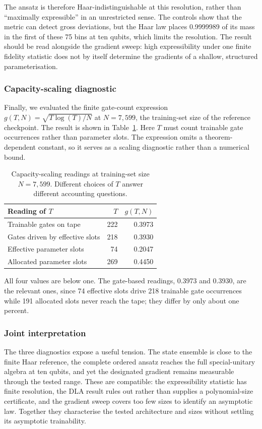 \documentclass[conference]{IEEEtran}
\begin{document}
The ansatz is therefore Haar-indistinguishable at this resolution, rather than
``maximally expressible'' in an unrestricted sense. The controls show that the
metric can detect gross deviations, but the Haar law places 0.9999989 of its
mass in the first of these 75 bins at ten qubits, which limits the resolution.
The result should be read alongside the gradient sweep: high expressibility
under one finite fidelity statistic does not by itself determine the gradients
of a shallow, structured parameterisation.

\subsubsection{Capacity-scaling diagnostic}
Finally, we evaluated the finite gate-count expression
$g(T,N)=\sqrt{T\log(T)/N}$ at $N=7,599$, the training-set size of the reference checkpoint. The result is shown in Table~\ref{tab:generalization}. Here
$T$ must count trainable gate occurrences rather than parameter slots. The expression omits a theorem-dependent constant, so it serves as a scaling diagnostic rather than a numerical bound.

\begin{table}[!t]
\caption{Capacity-scaling readings at training-set size $N=7,599$. Different choices of $T$ answer different accounting questions.}
\label{tab:generalization}
\centering
\small
\begin{tabular}{@{}lrr@{}}
\toprule
\textbf{Reading of $T$} & \textbf{$T$} & \textbf{$g(T,N)$} \\
\midrule
Trainable gates on tape & 222 & 0.3973 \\
Gates driven by effective slots & 218 & 0.3930 \\
Effective parameter slots & 74 & 0.2047 \\
Allocated parameter slots & 269 & 0.4450 \\
\bottomrule
\end{tabular}
\end{table}

All four values are below one. The gate-based readings, 0.3973 and 0.3930, are the relevant ones, since 74 effective slots drive 218 trainable gate occurrences while 191 allocated slots never reach the tape; they differ by only about one percent.

\subsubsection{Joint interpretation}
The three diagnostics expose a useful tension. The state ensemble is close to
the finite Haar reference, the complete ordered ansatz reaches the full
special-unitary algebra at ten qubits, and yet the designated gradient remains
measurable through the tested range. These are compatible: the expressibility statistic has finite resolution, the DLA result rules out rather than supplies a polynomial-size certificate, and the gradient sweep covers too few sizes to identify an asymptotic law. Together they characterise the tested architecture and sizes without settling its asymptotic trainability.
\end{document}
